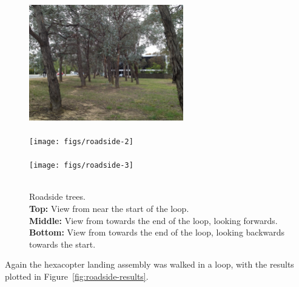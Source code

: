 \documentclass[12pt,oneside,a4paper,draft]{book}
\begin{document}
\begin{figure}
  \centering
  \includegraphics[width=0.6\textwidth]{figs/roadside-1}\\
  ~\\
  \texttt{[image: figs/roadside-2]}\\
  ~\\
  \texttt{[image: figs/roadside-3]}\\
  ~\\
  \caption{Roadside trees.\\\textbf{Top:} View from near the start of
    the loop.\\\textbf{Middle:} View from towards the end of the loop,
  looking forwards.\\\textbf{Bottom:} View from towards the end of the
  loop, looking backwards towards the start.}
  \label{fig:roadside-trees}
\end{figure}

Again the hexacopter landing assembly was walked in a loop, with the
results plotted in Figure~\ref{fig:roadside-results}.
\end{document}
